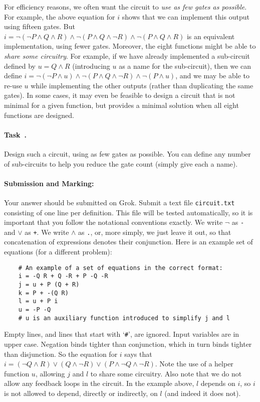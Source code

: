 \documentclass[11pt]{article}
\newcounter{challenge}
\newcounter{task}
\renewcommand{\thetask}{Task~\arabic{challenge}\Alph{task}}
\newcommand{\task}{
    \refstepcounter{task}
    \paragraph{\thetask.}
}
\newcommand{\submission}[0]{\paragraph{Submission and Marking:}}
\newcommand{\groksubmission}[0]{
Your answer should be submitted on Grok.}
\begin{document}
For efficiency reasons, we often want the circuit to \emph{use as few gates
as possible}.
For example, the above equation for $i$ shows that we can implement this
output using fifteen gates. \linebreak
But 
$i = \neg (\neg P \land Q \land R) 
\land \neg (P \land Q \land \neg R) 
\land \neg (P \land Q \land R)$ is an equivalent implementation, 
using fewer gates.
Moreover, the eight functions might be able to \emph{share some circuitry}.
For example, if we have already implemented a sub-circuit defined by
$u = Q \land R$ (introducing $u$ as a name for the sub-circuit), then we
can define 
$i = \neg (\neg P \land u) 
\land \neg (P \land Q \land \neg R) 
\land \neg (P \land u)$, 
and we may be able to re-use $u$ while
implementing the other outputs (rather than duplicating the same gates).
In some cases, it may even be feasible to design a circuit 
that is not minimal for a given function, 
but provides a minimal solution when all eight functions are designed.

\task

Design such a circuit, using as few gates as possible.
You can define any number of sub-circuits to help you reduce the
gate count (simply give each a name).

\submission 

\groksubmission{}
Submit a text file \verb!circuit.txt! consisting of one line per definition.
This file will be tested automatically, 
so it is important that you follow the notational conventions exactly.
We write $\neg$ as \texttt{-} and $\lor$ as \texttt{+}.
We write $\land$ as \texttt{.}, or, more simply, we just leave it out,
so that concatenation of expressions denotes their conjunction.
Here is an example set of equations (for a different problem):
\begin{verbatim}
    # An example of a set of equations in the correct format:
    i = -Q R + Q -R + P -Q -R
    j = u + P (Q + R)
    k = P + -(Q R)
    l = u + P i
    u = -P -Q
    # u is an auxiliary function introduced to simplify j and l
\end{verbatim}

Empty lines, and lines that start with `\texttt{\#}', are ignored.
Input variables are in upper case.
Negation binds tighter than conjunction, which in
turn binds tighter than disjunction.
So the equation for $i$ says that
$i = (\neg Q \land R) \lor (Q \land \neg R)
        \lor (P \land \neg Q \land \neg R)$.
Note the use of a helper function $u$, allowing $j$ and $l$ to
share some circuitry.
Also note that we do not allow any feedback loops in the circuit.
In the example above, $l$ depends on $i$, so $i$ is not allowed
to depend, directly or indirectly, on $l$ (and indeed it does not).
\end{document}
